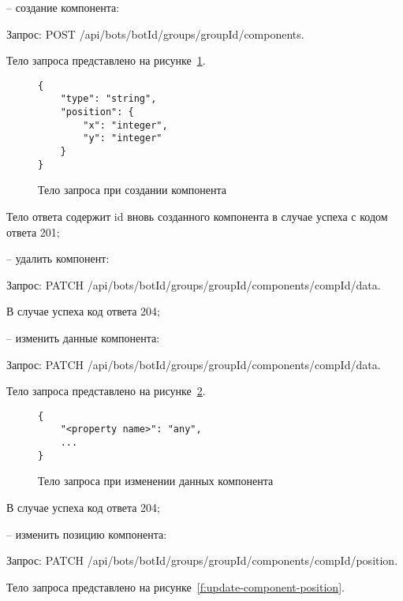 -- \hspace{\clabelsep} создание компонента:

Запрос: POST /api/bots/{botId}/groups/{groupId}/components.

Тело запроса представлено на рисунке~\ref{f:add-component-request-body}.

\begin{figure}[ht]
	\centering
	\vspace{\toppaddingoffigure}
	\begin{lstlisting}
{
    "type": "string",
    "position": {
        "x": "integer",
        "y": "integer"
    }
}
    \end{lstlisting}
	\caption{Тело запроса при создании компонента}
	\label{f:add-component-request-body}
\end{figure}

Тело ответа содержит id вновь созданного компонента в случае успеха с
кодом ответа 201;

-- \hspace{\clabelsep} удалить компонент:

Запрос: PATCH /api/bots/{botId}/groups/{groupId}/components/{compId}/data.

В случае успеха код ответа 204;


-- \hspace{\clabelsep} изменить данные компонента:

Запрос: PATCH /api/bots/{botId}/groups/{groupId}/components/{compId}/data.

Тело запроса представлено на рисунке~\ref{f:update-component-data}.


\begin{figure}[ht]
	\centering
	\vspace{\toppaddingoffigure}
	\begin{lstlisting}
{
    "<property name>": "any",
    ...
}
    \end{lstlisting}
	\caption{Тело запроса при изменении данных компонента}
	\label{f:update-component-data}
\end{figure}

В случае успеха код ответа 204;

-- \hspace{\clabelsep} изменить позицию компонента:

Запрос: PATCH /api/bots/{botId}/groups/{groupId}/components/{compId}/position.

Тело запроса представлено на рисунке~\ref{f:update-component-position}.


